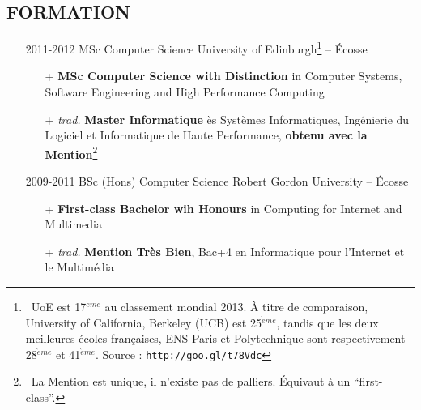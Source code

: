 \documentclass{res}
\begin{document}
  
\ifisanon
	\address{Des sections ont \'et\'e enlev\'ees. Elles sont indiqu\'ees par un \textit{(Anonyme)}}
\else

	\address{ \faMapMarker~Kempische Steenweg 396/4.1, 3500 Hasselt, Belgium \\ 📧 samuel@giffard.co ~~ \faMobile~+32 (0) 4-84-14-10-33 \\ \\ \textbf{Formateur, Ing\'enieur \& \'Evang\'eliste Python}  }
\fi

\begin{resume}
 
\section{FORMATION}       
\begin{itemize} 
\item[] 2011-2012 \tabto{2cm} MSc Computer Science \hfill University of Edinburgh\footnote{~UoE est 17$^{\grave{e}me}$ au classement mondial 2013. \`A titre de comparaison, University of California, Berkeley (UCB) est 25$^{\grave{e}me}$, tandis que les deux meilleures \'ecoles fran\c{c}aises, ENS Paris et Polytechnique sont respectivement 28$^{\grave{e}me}$ et 41$^{\grave{e}me}$. Source : \texttt{http://goo.gl/t78Vdc}} -- \'Ecosse 
	\begin{itemize}
		\item[+] \textbf{MSc Computer Science with Distinction} in Computer Systems, Software Engineering and High Performance Computing
		\item[+] \textit{trad.} \textbf{Master Informatique} \`es Syst\`emes Informatiques, Ing\'enierie du Logiciel et Informatique de Haute Performance, \textbf{obtenu avec la Mention}\footnote{~La Mention est unique, il n'existe pas de palliers. \'Equivaut \`a un ``first-class''.}
	\end{itemize}
	
\item[] 2009-2011 \tabto{2cm} BSc (Hons) Computer Science \hfill Robert Gordon University -- \'Ecosse  
	\begin{itemize}
		\item[+] \textbf{First-class Bachelor wih Honours} in Computing for Internet and Multimedia
		\item[+] \textit{trad.} \textbf{Mention Tr\`es Bien}, Bac+4 en Informatique pour l'Internet et le Multim\'edia
	\end{itemize}
	

\end{itemize}
\end{resume}
\end{document}
